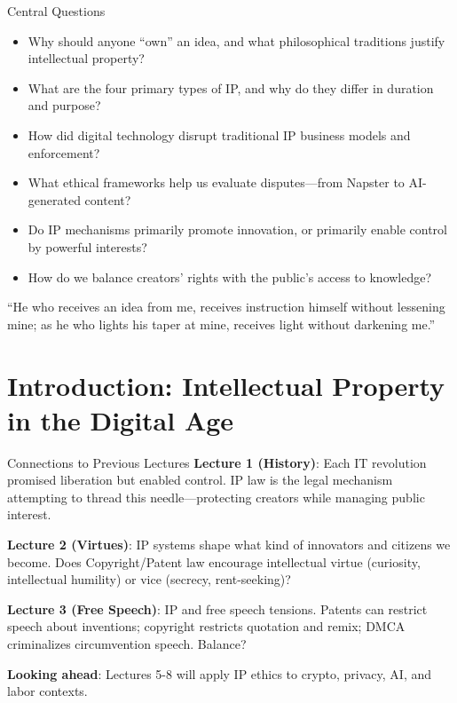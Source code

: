 ﻿\documentclass[aspectratio=169,11pt]{beamer}
\begin{document}
\begin{frame}[shrink=8]{Central Questions}
\begin{itemize}
    \item Why should anyone ``own'' an idea, and what philosophical traditions justify intellectual property?
    \item What are the four primary types of IP, and why do they differ in duration and purpose?
    \item How did digital technology disrupt traditional IP business models and enforcement?
    \item What ethical frameworks help us evaluate disputes---from Napster to AI-generated content?
    \item Do IP mechanisms primarily promote innovation, or primarily enable control by powerful interests?
    \item How do we balance creators' rights with the public's access to knowledge?
\end{itemize}

\vspace{0.2cm}
\begin{quotebox}
``He who receives an idea from me, receives instruction himself without lessening mine; as he who lights his taper at mine, receives light without darkening me.''
\end{quotebox}
\end{frame}

\section{Introduction: Intellectual Property in the Digital Age}

\begin{frame}{Connections to Previous Lectures}
\textbf{Lecture 1 (History)}: Each IT revolution promised liberation but enabled control. IP law is the legal mechanism attempting to thread this needle---protecting creators while managing public interest.

\vspace{0.2cm}
\textbf{Lecture 2 (Virtues)}: IP systems shape what kind of innovators and citizens we become. Does Copyright/Patent law encourage intellectual virtue (curiosity, intellectual humility) or vice (secrecy, rent-seeking)?

\vspace{0.2cm}
\textbf{Lecture 3 (Free Speech)}: IP and free speech tensions. Patents can restrict speech about inventions; copyright restricts quotation and remix; DMCA criminalizes circumvention speech. Balance?

\vspace{0.2cm}
\textbf{Looking ahead}: Lectures 5-8 will apply IP ethics to crypto, privacy, AI, and labor contexts.
\end{frame}
\end{document}
